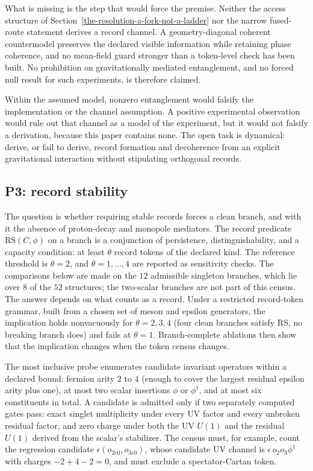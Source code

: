 \documentclass[11pt]{article}
\theoremstyle{definition}
\begin{document}
What is missing is the step that would force the premise. Neither the access structure of
Section~\ref{the-resolution-a-fork-not-a-ladder} nor the narrow fused-route statement derives a record channel. A
geometry-diagonal coherent countermodel preserves the declared visible information while retaining phase coherence,
and no mean-field guard stronger than a token-level check has been built. No prohibition on gravitationally mediated
entanglement, and no forced null result for such experiments, is therefore claimed.

Within the assumed model, nonzero entanglement would falsify the implementation or the channel assumption. A positive
experimental observation would rule out that channel as a model of the experiment, but it would not falsify a
derivation, because this paper contains none. The open task is dynamical: derive, or fail to derive, record formation
and decoherence from an explicit gravitational interaction without stipulating orthogonal records.

\subsection{P3: record stability}\label{record-stability-open-program}

The question is whether requiring stable records forces a clean branch, and with it the absence of proton-decay and
monopole mediators. The record predicate \(\mathrm{RS}(C,\phi)\) on a branch is a conjunction of persistence,
distinguishability, and a capacity condition: at least \(\theta\) record tokens of the declared kind. The reference
threshold is \(\theta=2\), and \(\theta=1,\dots,4\) are reported as sensitivity checks. The comparisons below are made
on the \(12\) admissible singleton branches, which lie over \(8\) of the \(52\) structures; the two-scalar branches are not
part of this census. The answer depends on what counts as a record. Under a restricted record-token grammar, built
from a chosen set of meson and epsilon generators, the implication holds nonvacuously for \(\theta=2,3,4\) (four clean
branches satisfy \(\mathrm{RS}\), no breaking branch does) and fails at \(\theta=1\). Branch-complete ablations then
show that the implication changes when the token census changes.

The most inclusive probe enumerates candidate invariant operators within a declared bound: fermion arity \(2\) to \(4\)
(enough to cover the largest residual epsilon arity plus one), at most two scalar insertions \(\phi\) or
\(\phi^\dagger\), and at most six constituents in total. A candidate is admitted only if two separately computed gates
pass: exact singlet multiplicity under every UV factor and every unbroken residual factor, and zero charge under both
the UV \(U(1)\) and the residual \(U(1)\) derived from the scalar's stabilizer. The census must, for example, count the
regression candidate \(\epsilon(o_{2c0},o_{3c0})\), whose candidate UV channel is \(\epsilon\,o_2o_3\phi^\dagger\) with
charges \(-2+4-2=0\), and must exclude a spectator-Cartan token.
\end{document}
